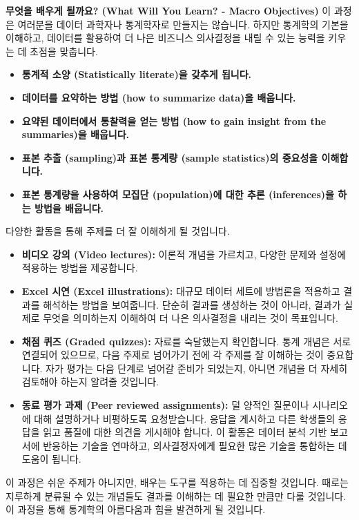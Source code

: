 \documentclass[11pt,a4paper]{book}
\theoremstyle{definition}
\begin{document}
\begin{summarybox}
\textbf{무엇을 배우게 될까요? (What Will You Learn? - Macro Objectives)}
이 과정은 여러분을 데이터 과학자나 통계학자로 만들지는 않습니다. 하지만 통계학의 기본을 이해하고, 데이터를 활용하여 더 나은 비즈니스 의사결정을 내릴 수 있는 능력을 키우는 데 초점을 맞춥니다.

\begin{itemize}
    \item \textbf{통계적 소양 (Statistically literate)을 갖추게 됩니다.}
    \item \textbf{데이터를 요약하는 방법 (how to summarize data)을 배웁니다.}
    \item \textbf{요약된 데이터에서 통찰력을 얻는 방법 (how to gain insight from the summaries)을 배웁니다.}
    \item \textbf{표본 추출 (sampling)과 표본 통계량 (sample statistics)의 중요성을 이해합니다.}
    \item \textbf{표본 통계량을 사용하여 모집단 (population)에 대한 추론 (inferences)을 하는 방법을 배웁니다.}
\end{itemize}
\end{summarybox}

\begin{tcolorbox}[title={어떻게 배우게 될까요? (How Will You Learn?)}]
다양한 활동을 통해 주제를 더 잘 이해하게 될 것입니다.
\begin{itemize}
    \item \textbf{비디오 강의 (Video lectures):} 이론적 개념을 가르치고, 다양한 문제와 설정에 적용하는 방법을 제공합니다.
    \item \textbf{Excel 시연 (Excel illustrations):} 대규모 데이터 세트에 방법론을 적용하고 결과를 해석하는 방법을 보여줍니다. 단순히 결과를 생성하는 것이 아니라, 결과가 실제로 무엇을 의미하는지 이해하여 더 나은 의사결정을 내리는 것이 목표입니다.
    \item \textbf{채점 퀴즈 (Graded quizzes):} 자료를 숙달했는지 확인합니다. 통계 개념은 서로 연결되어 있으므로, 다음 주제로 넘어가기 전에 각 주제를 잘 이해하는 것이 중요합니다. 자가 평가는 다음 단계로 넘어갈 준비가 되었는지, 아니면 개념을 더 자세히 검토해야 하는지 알려줄 것입니다.
    \item \textbf{동료 평가 과제 (Peer reviewed assignments):} 덜 양적인 질문이나 시나리오에 대해 설명하거나 비평하도록 요청받습니다. 응답을 게시하고 다른 학생들의 응답을 읽고 품질에 대한 의견을 게시해야 합니다. 이 활동은 데이터 분석 기반 보고서에 반응하는 기술을 연마하고, 의사결정자에게 필요한 많은 기술을 통합하는 데 도움이 됩니다.
\end{itemize}
이 과정은 쉬운 주제가 아니지만, 배우는 도구를 적용하는 데 집중할 것입니다. 때로는 지루하게 분류될 수 있는 개념들도 결과를 이해하는 데 필요한 만큼만 다룰 것입니다. 이 과정을 통해 통계학의 아름다움과 힘을 발견하게 될 것입니다.
\end{tcolorbox}
\end{document}
